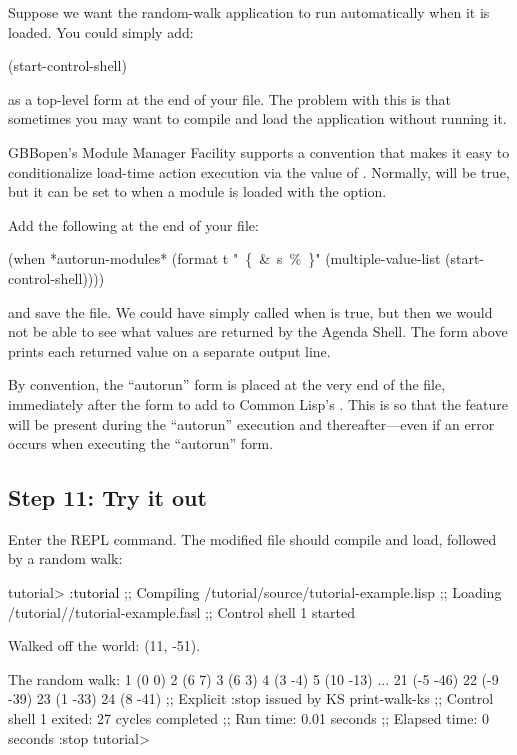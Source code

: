 \documentclass[10pt,twoside,english,pdftex]{article}
\begin{document}
Suppose we want the random-walk application to run automatically when it is
loaded.  You could simply add:
% 
\W\supp
\begin{example}
\textcolor{darkergray}{%
  (start-control-shell)}
\end{example}
%
as a top-level form at the end of your 
file.  The problem with this is that sometimes you may want to compile and
load the application without running it.

GBBopen's Module Manager Facility supports a convention that makes it easy to
conditionalize load-time action execution via the value of
.  Normally,
 will be true, but it can be set to \nil{}
when a module is loaded with the  option.

Add the following at the end of your  file:
% 
\W\supp
\begin{example}
  (when *autorun-modules* 
    (format t "~\{~\&~s~\%~\}" (multiple-value-list (start-control-shell))))
\end{example}
%
and save the file.  We could have simply called
 when  is
true, but then we would not be able to see what values are returned by the
Agenda Shell.  The  form above prints each returned value on a
separate output line.

By convention, the ``autorun'' form is placed at the very end of the file,
immediately after the form to add  to Common Lisp's
.  This is so that the  feature will be
present during the ``autorun'' execution and thereafter---even if an error
occurs when executing the ``autorun'' form.

\subsection*{Step 11: Try it out}

Enter the  REPL command. The modified
 file should compile and load, followed by
a random walk:
%
\W\supp
\begin{smallexample}
\textcolor{darkergray}{%
  tutorial> \textcolor{black}{:tutorial}
  ;; Compiling /tutorial/source/tutorial-example.lisp
  ;; Loading /tutorial//tutorial-example.fasl
  ;; Control shell 1 started

  Walked off the world: (11, -51).

  The random walk:
  1 (0 0)
  2 (6 7)
  3 (6 3)
  4 (3 -4)
  5 (10 -13)
     ...
  21 (-5 -46)
  22 (-9 -39)
  23 (1 -33)
  24 (8 -41)
  ;; Explicit :stop issued by KS print-walk-ks
  ;; Control shell 1 exited: 27 cycles completed
  ;; Run time: 0.01 seconds
  ;; Elapsed time: 0 seconds
  :stop
  tutorial>}
\end{smallexample}
\end{document}
